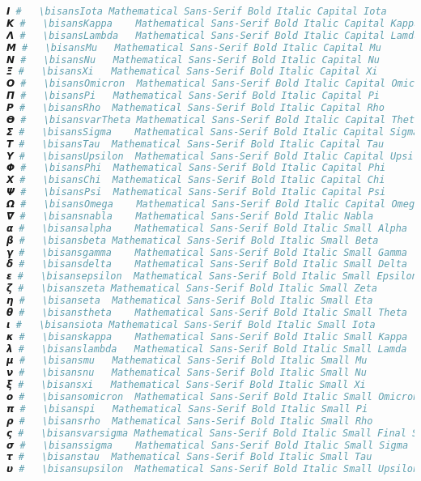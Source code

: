 \begin{lstlisting}[language=Julia]
𝞘 #   \bisansIota Mathematical Sans-Serif Bold Italic Capital Iota
𝞙 #   \bisansKappa    Mathematical Sans-Serif Bold Italic Capital Kappa
𝞚 #   \bisansLambda   Mathematical Sans-Serif Bold Italic Capital Lamda
𝞛 #   \bisansMu   Mathematical Sans-Serif Bold Italic Capital Mu
𝞜 #   \bisansNu   Mathematical Sans-Serif Bold Italic Capital Nu
𝞝 #   \bisansXi   Mathematical Sans-Serif Bold Italic Capital Xi
𝞞 #   \bisansOmicron  Mathematical Sans-Serif Bold Italic Capital Omicron
𝞟 #   \bisansPi   Mathematical Sans-Serif Bold Italic Capital Pi
𝞠 #   \bisansRho  Mathematical Sans-Serif Bold Italic Capital Rho
𝞡 #   \bisansvarTheta Mathematical Sans-Serif Bold Italic Capital Theta Symbol
𝞢 #   \bisansSigma    Mathematical Sans-Serif Bold Italic Capital Sigma
𝞣 #   \bisansTau  Mathematical Sans-Serif Bold Italic Capital Tau
𝞤 #   \bisansUpsilon  Mathematical Sans-Serif Bold Italic Capital Upsilon
𝞥 #   \bisansPhi  Mathematical Sans-Serif Bold Italic Capital Phi
𝞦 #   \bisansChi  Mathematical Sans-Serif Bold Italic Capital Chi
𝞧 #   \bisansPsi  Mathematical Sans-Serif Bold Italic Capital Psi
𝞨 #   \bisansOmega    Mathematical Sans-Serif Bold Italic Capital Omega
𝞩 #   \bisansnabla    Mathematical Sans-Serif Bold Italic Nabla
𝞪 #   \bisansalpha    Mathematical Sans-Serif Bold Italic Small Alpha
𝞫 #   \bisansbeta Mathematical Sans-Serif Bold Italic Small Beta
𝞬 #   \bisansgamma    Mathematical Sans-Serif Bold Italic Small Gamma
𝞭 #   \bisansdelta    Mathematical Sans-Serif Bold Italic Small Delta
𝞮 #   \bisansepsilon  Mathematical Sans-Serif Bold Italic Small Epsilon
𝞯 #   \bisanszeta Mathematical Sans-Serif Bold Italic Small Zeta
𝞰 #   \bisanseta  Mathematical Sans-Serif Bold Italic Small Eta
𝞱 #   \bisanstheta    Mathematical Sans-Serif Bold Italic Small Theta
𝞲 #   \bisansiota Mathematical Sans-Serif Bold Italic Small Iota
𝞳 #   \bisanskappa    Mathematical Sans-Serif Bold Italic Small Kappa
𝞴 #   \bisanslambda   Mathematical Sans-Serif Bold Italic Small Lamda
𝞵 #   \bisansmu   Mathematical Sans-Serif Bold Italic Small Mu
𝞶 #   \bisansnu   Mathematical Sans-Serif Bold Italic Small Nu
𝞷 #   \bisansxi   Mathematical Sans-Serif Bold Italic Small Xi
𝞸 #   \bisansomicron  Mathematical Sans-Serif Bold Italic Small Omicron
𝞹 #   \bisanspi   Mathematical Sans-Serif Bold Italic Small Pi
𝞺 #   \bisansrho  Mathematical Sans-Serif Bold Italic Small Rho
𝞻 #   \bisansvarsigma Mathematical Sans-Serif Bold Italic Small Final Sigma
𝞼 #   \bisanssigma    Mathematical Sans-Serif Bold Italic Small Sigma
𝞽 #   \bisanstau  Mathematical Sans-Serif Bold Italic Small Tau
𝞾 #   \bisansupsilon  Mathematical Sans-Serif Bold Italic Small Upsilon

\end{lstlisting}
